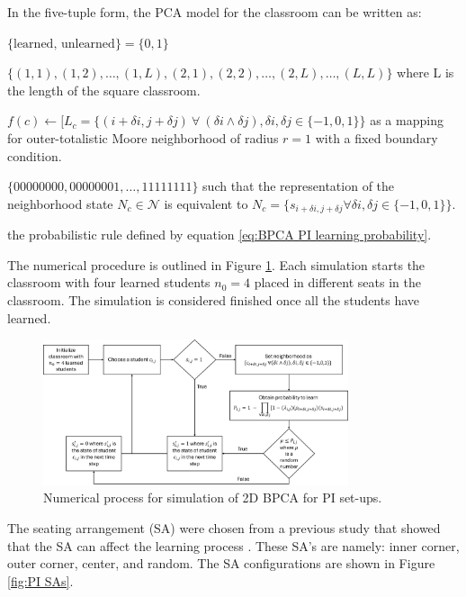 In the five-tuple form, the PCA model for the classroom can be written as:

\begin{CAdef}
\itemS $\lbrace \text{learned, unlearned} \rbrace = \lbrace 0, 1 \rbrace$

\itemC $\lbrace (1,1), (1,2), \dots, (1,L), (2, 1), (2,2), \dots, (2,L), \dots, (L,L)\rbrace$ where L is the length of the square classroom.

\itemL $f(c) \leftarrow \lbrack L_c = \lbrace (i+\delta i,j+\delta j) ~\forall~ (\delta i \land \delta j),  \delta i, \delta j \in \lbrace -1,0,1 \rbrace \rbrace $ as a mapping for outer-totalistic Moore neighborhood of radius $r=1$ with a fixed boundary condition.

\itemN $\lbrace 00000000, 00000001, \dots, 11111111 \rbrace$ such that the representation of the neighborhood state $N_c \in \mathcal{N}$ is equivalent to $N_c = \lbrace s_{i+\delta i, j+\delta j} \forall \delta i, \delta j \in \lbrace -1,0,1 \rbrace \rbrace$.

\itemR the probabilistic rule defined by equation \ref{eq:BPCA PI learning probability}.
\end{CAdef}

The numerical procedure is outlined in Figure \ref{fig:2DBPCA PI Flowchart}. Each simulation starts the classroom with four learned students $n_0 = 4$ placed in different seats in the classroom. The simulation is considered finished once all the students have learned.

\begin{figure}[htbp!]
    \centering
    \includegraphics[width=0.8\textwidth]{figures/2DBPCA PI Flowchart.png}
    \caption[Peer instruction flowchart]{Numerical process for simulation of 2D BPCA for PI set-ups.}
    \label{fig:2DBPCA PI Flowchart}
\end{figure}

The seating arrangement (SA) were chosen from a previous study that showed that the SA can affect the learning process \cite{roxas2010seating}. These SA's are namely: inner corner, outer corner, center, and random. The SA configurations are shown in Figure \ref{fig:PI SAs}.

